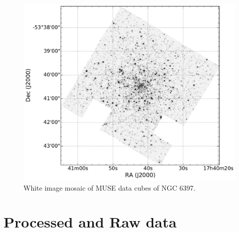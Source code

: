 \begin{figure}[h]
        \centering
        \includegraphics[scale=.6]{assets/images/mosaic.pdf}
\caption{White image mosaic of MUSE data cubes of NGC 6397. }
\label{fig:clustermuse}
\end{figure}

\section{Processed and Raw data} 

